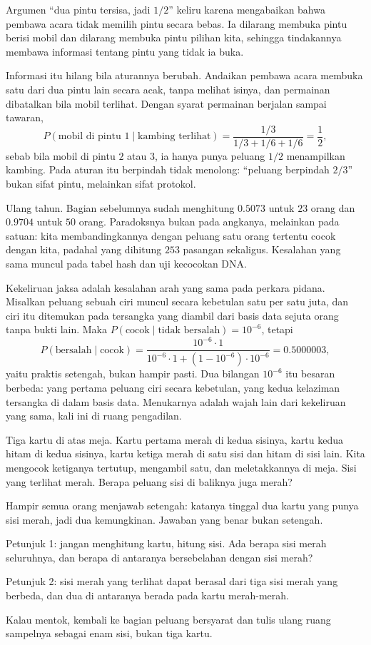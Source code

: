 Argumen ``dua pintu tersisa, jadi $1/2$'' keliru karena mengabaikan bahwa pembawa acara
tidak memilih pintu secara bebas. Ia dilarang membuka pintu berisi mobil dan dilarang
membuka pintu pilihan kita, sehingga tindakannya membawa informasi tentang pintu yang
tidak ia buka.

Informasi itu hilang bila aturannya berubah. Andaikan pembawa acara membuka satu dari
dua pintu lain secara acak, tanpa melihat isinya, dan permainan dibatalkan bila mobil
terlihat. Dengan syarat permainan berjalan sampai tawaran,
\[
P(\text{mobil di pintu }1\mid \text{kambing terlihat})
=\frac{1/3}{1/3+1/6+1/6}=\frac{1}{2},
\]
sebab bila mobil di pintu $2$ atau $3$, ia hanya punya peluang $1/2$ menampilkan kambing.
Pada aturan itu berpindah tidak menolong: ``peluang berpindah $2/3$'' bukan sifat pintu,
melainkan sifat protokol.


Ulang tahun. Bagian sebelumnya sudah menghitung $0.5073$ untuk $23$ orang dan $0.9704$
untuk $50$ orang. Paradoksnya bukan pada angkanya, melainkan pada satuan: kita
membandingkannya dengan peluang satu orang tertentu cocok dengan kita, padahal yang
dihitung $253$ pasangan sekaligus. Kesalahan yang sama muncul pada tabel hash dan uji
kecocokan DNA.

Kekeliruan jaksa adalah kesalahan arah yang sama pada perkara pidana. Misalkan peluang
sebuah ciri muncul secara kebetulan satu per satu juta, dan ciri itu ditemukan pada
tersangka yang diambil dari basis data sejuta orang tanpa bukti lain. Maka
$P(\text{cocok}\mid\text{tidak bersalah})=10^{-6}$, tetapi
\[
P(\text{bersalah}\mid\text{cocok})
=\frac{10^{-6}\cdot 1}{10^{-6}\cdot 1+(1-10^{-6})\cdot 10^{-6}}=0.5000003,
\]
yaitu praktis setengah, bukan hampir pasti. Dua bilangan $10^{-6}$ itu besaran berbeda:
yang pertama peluang ciri secara kebetulan, yang kedua kelaziman tersangka di dalam basis
data. Menukarnya adalah wajah lain dari kekeliruan yang sama, kali ini di ruang
pengadilan.

\begin{tantangan}
Tiga kartu di atas meja. Kartu pertama merah di kedua sisinya, kartu kedua hitam di kedua
sisinya, kartu ketiga merah di satu sisi dan hitam di sisi lain. Kita mengocok ketiganya
tertutup, mengambil satu, dan meletakkannya di meja. Sisi yang terlihat merah. Berapa
peluang sisi di baliknya juga merah?

Hampir semua orang menjawab setengah: katanya tinggal dua kartu yang punya sisi merah,
jadi dua kemungkinan. Jawaban yang benar bukan setengah.

Petunjuk 1: jangan menghitung kartu, hitung sisi. Ada berapa sisi merah seluruhnya, dan
berapa di antaranya bersebelahan dengan sisi merah?

Petunjuk 2: sisi merah yang terlihat dapat berasal dari tiga sisi merah yang berbeda,
dan dua di antaranya berada pada kartu merah-merah.

Kalau mentok, kembali ke bagian peluang bersyarat dan tulis ulang ruang sampelnya sebagai
enam sisi, bukan tiga kartu.
\end{tantangan}

